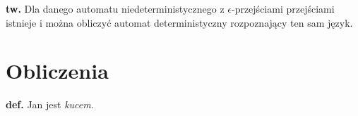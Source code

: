 \documentclass[draft]{article}
\newcommand{\tw}{\textbf{tw. }}
\newcommand{\deff}{\textbf{def. }}
\begin{document}
	\tw Dla danego automatu niedeterministycznego z $\epsilon$-przejściami przejściami istnieje i można obliczyć automat deterministyczny rozpoznający ten sam język.





\section{Obliczenia}
	\deff Jan jest \textit{kucem}.
\end{document}
